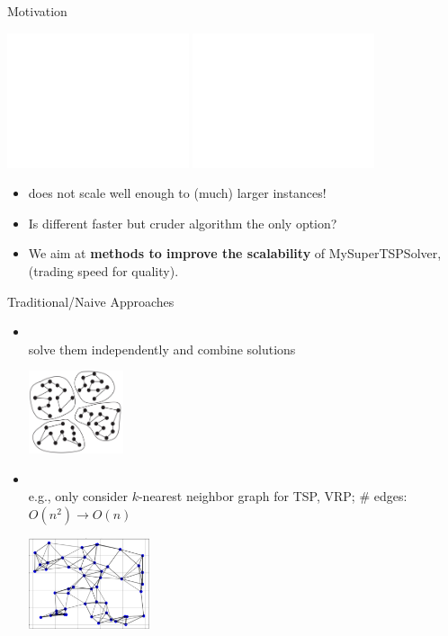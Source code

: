 \documentclass[aspectratio=1610]{beamer}
\newcommand{\important}[1]{{\color{green!60!black}#1}}
\begin{document}
\begin{frame}{Motivation}

	\begin{center}
	\includegraphics<1>[width=0.4\textwidth]{graphics/hybrid-motivation.pdf}
	\includegraphics<2>[width=0.4\textwidth]{graphics/hybrid-motivation2.pdf}
	\end{center}

	\begin{itemize}
		\item 
		 does not scale well enough to (much) larger instances!
	
		\item \alert{Is different faster but cruder algorithm the only option?}
		\item<2> We aim at \important{\bf methods to improve the scalability} of MySuperTSPSolver,\\ (trading speed for quality).
	\end{itemize}
\end{frame}

\begin{frame}{Traditional/Naive Approaches}
	\begin{itemize}
	\item{\\
		solve them independently and combine solutions}\\
		\begin{center}
			\includegraphics[width=0.22\textwidth]{graphics/partition.jpg}
		\end{center}
	\item<2>{}\\
		e.g., only consider $k$-nearest neighbor graph for TSP, VRP; \# edges: $O(n^2)\rightarrow O(n)$\\
		\begin{center}
			\includegraphics[width=0.28\textwidth]{graphics/kNN-graph.jpg}
		\end{center}
	\end{itemize}
\end{frame}
\end{document}

